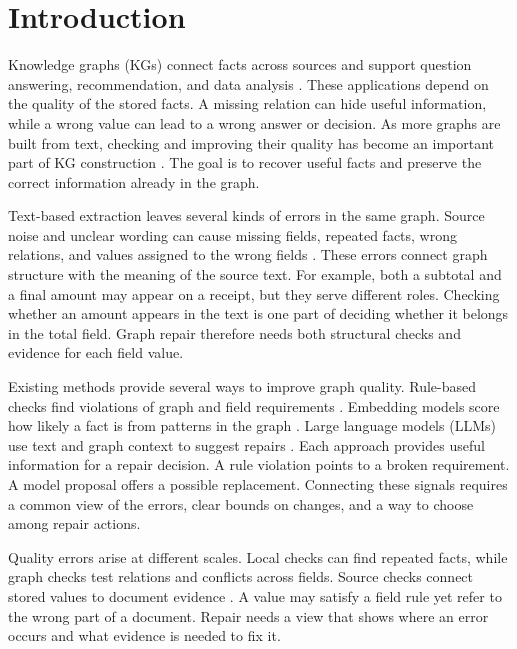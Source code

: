 \section{Introduction}
\label{sec:introduction}

Knowledge graphs (KGs) connect facts across sources and support question
answering, recommendation, and data analysis \citep{ref_ji2021,ref_pan2023}.
These applications depend on the quality of the stored facts.
A missing relation can hide useful information, while a wrong value can
lead to a wrong answer or decision.
As more graphs are built from text, checking and improving their quality
has become an important part of KG construction
\citep{ref_zaveri2016,ref_paulheim2017}.
The goal is to recover useful facts and preserve the correct information
already in the graph.

Text-based extraction leaves several kinds of errors in the same graph.
Source noise and unclear wording can cause missing fields, repeated facts,
wrong relations, and values assigned to the wrong fields
\citep{ref_ji2021,ref_paulheim2017}.
These errors connect graph structure with the meaning of the source text.
For example, both a subtotal and a final amount may appear on a receipt,
but they serve different roles.
Checking whether an amount appears in the text is one part of deciding
whether it belongs in the total field.
Graph repair therefore needs both structural checks and evidence for each
field value.

Existing methods provide several ways to improve graph quality.
Rule-based checks find violations of graph and field requirements
\citep{ref_kontokostas2014,ref_shacl2017}.
Embedding models score how likely a fact is from patterns in the graph
\citep{ref_bordes2013,ref_nickel2016}.
Large language models (LLMs) use text and graph context to suggest repairs
\citep{ref_pan2023,ref_lin2025}.
Each approach provides useful information for a repair decision.
A rule violation points to a broken requirement.
A model proposal offers a possible replacement.
Connecting these signals requires a common view of the errors, clear
bounds on changes, and a way to choose among repair actions.

Quality errors arise at different scales.
Local checks can find repeated facts, while graph checks test relations
and conflicts across fields.
Source checks connect stored values to document evidence
\citep{ref_zaveri2016,ref_wang2021}.
A value may satisfy a field rule yet refer to the wrong part of a document.
Repair needs a view that shows where an error occurs and what evidence
is needed to fix it.

